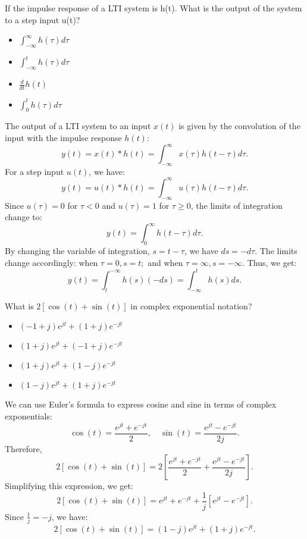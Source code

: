 \documentclass{ee102_notes}
\begin{document}
\begin{popquiz}
    If the impulse response of a LTI system is h(t). What is the output of the system to a step input u(t)?
    \begin{itemize}
        \item $\int_{-\infty}^{\infty} h(\tau) d\tau$
        \item $\int_{-\infty}^{t} h(\tau) d\tau$
        \item $\frac{d}{dt} h(t)$
        \item $\int_{0}^{t} h(\tau) d\tau$
    \end{itemize}
    \popqsplit
    The output of a LTI system to an input $x(t)$ is given by the convolution of the input with the impulse response $h(t)$:
    \[
    y(t) = x(t) * h(t) = \int_{-\infty}^{\infty} x(\tau) h(t - \tau) d\tau.
    \]
    For a step input $u(t)$, we have:
    \[
    y(t) = u(t) * h(t) = \int_{-\infty}^{\infty} u(\tau) h(t - \tau) d\tau.
    \]
    Since $u(\tau) = 0$ for $\tau < 0$ and $u(\tau) = 1$ for $\tau \geq 0$, the limits of integration change to:
    \[
    y(t) = \int_{0}^{\infty} h(t - \tau) d\tau.
    \]
    By changing the variable of integration, $s = t - \tau$, we have $ds = -d\tau$. The limits change accordingly: when $\tau = 0, s = t;$ and when $\tau = \infty, s = -\infty$. Thus, we get:
    \[
    y(t) = \int_{t}^{-\infty} h(s) (-ds) = \int_{-\infty}^{t} h(s) ds.
    \]

\end{popquiz}
\begin{popquiz}
    What is $2 [\cos(t) + \sin(t)]$ in complex exponential notation?
    \begin{itemize}
      \item $(-1 + j)e^{jt} + (1 + j)e^{-jt}$
      \item $(1 + j)e^{jt} + (-1 + j)e^{-jt}$
      \item $(1 + j)e^{jt} + (1 - j)e^{-jt}$
      \item $(1 - j)e^{jt} + (1 + j)e^{-jt}$
    \end{itemize}
    \popqsplit
    We can use Euler's formula to express cosine and sine in terms of complex exponentials:
    \[
    \cos(t) = \frac{e^{j t} + e^{-j t}}{2}, \quad \sin(t) = \frac{e^{j t} - e^{-j t}}{2j}.
    \]
    Therefore,
    \[
    2 [\cos(t) + \sin(t)] = 2 \left[ \frac{e^{j t} + e^{-j t}}{2} + \frac{e^{j t} - e^{-j t}}{2j} \right].
    \]
    Simplifying this expression, we get:
    \[
    2 [\cos(t) + \sin(t)] = e^{j t} + e^{-j t} + \frac{1}{j} [e^{j t} - e^{-j t}].
    \]
    Since $\frac{1}{j} = -j$, we have:
    \[
    2 [\cos(t) + \sin(t)] = (1 - j)e^{j t} + (1 + j)e^{-j t}.
    \]
\end{popquiz}
\end{document}
